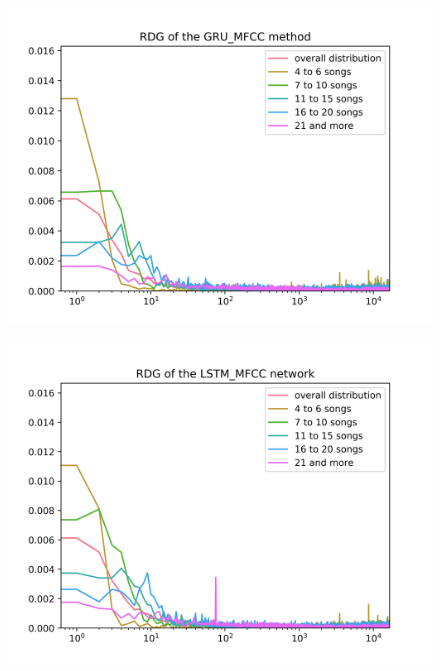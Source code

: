 \begin{figure}[h]
\centering
\begin{minipage}{.5\textwidth}
  \centering
  \includegraphics[width=1\linewidth]{./img/gru_mfcc_graph.png}
  \label{fig:gru_mfcc_distribution}
\end{minipage}%
\begin{minipage}{.5\textwidth}
  \centering
  \includegraphics[width=1\linewidth]{./img/lstm_mfcc_graph.png}
  \label{fig:lstm_mfcc_distribution}
\end{minipage}
\end{figure}\label{fig:mfcc_nn_distributions}




